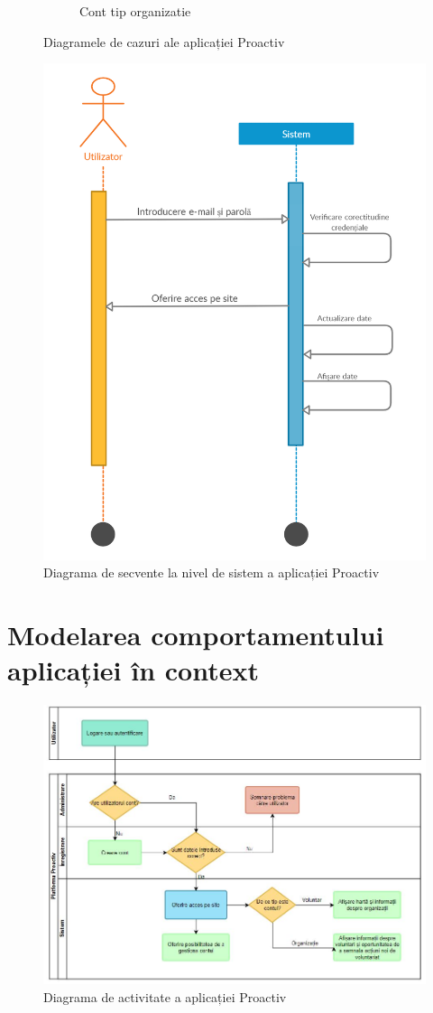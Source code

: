 \documentclass[12pt,a4paper]{report}
\begin{document}
\begin{figure}[h!]
\begin{subfigure}[b]{0.42\linewidth}
    \caption{Cont tip organizatie}
  \end{subfigure}
  \caption{Diagramele de cazuri ale aplicației Proactiv}
\end{figure}

\begin{figure}[h]
\centering
  \includegraphics[width=0.5\linewidth]{Sequence.jpg}
  \caption{Diagrama de secvente la nivel de sistem a aplicației Proactiv}
\end{figure}


\newpage

\section{Modelarea comportamentului aplicației în context}
\begin{figure}[h!]
\centering
  \includegraphics[width=0.7\linewidth]{swimlane.JPG}
  \caption{Diagrama de activitate a aplicației Proactiv}
\end{figure}
\end{document}
